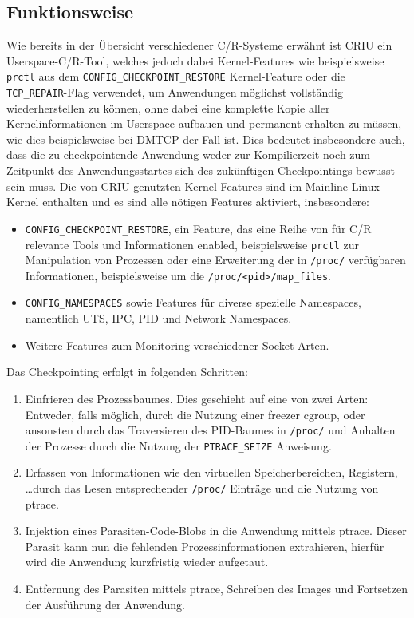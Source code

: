\documentclass[a4paper]{article}
\begin{document}
\subsection{Funktionsweise}
Wie bereits in der Übersicht verschiedener C/R-Systeme erwähnt ist CRIU ein Userspace-C/R-Tool, welches jedoch dabei Kernel-Features wie beispielsweise \texttt{prctl} aus dem \texttt{CONFIG\_CHECKPOINT\_RESTORE} Kernel-Feature oder die \texttt{TCP\_REPAIR}-Flag verwendet, um Anwendungen möglichst vollständig wiederherstellen zu können, ohne dabei eine komplette Kopie aller Kernelinformationen im Userspace aufbauen und permanent erhalten zu müssen, wie dies beispielsweise bei DMTCP der Fall ist. 
Dies bedeutet insbesondere auch, dass die zu checkpointende Anwendung weder zur Kompilierzeit noch zum Zeitpunkt des Anwendungsstartes sich des zukünftigen Checkpointings bewusst sein muss.
Die von CRIU genutzten Kernel-Features sind im Mainline-Linux-Kernel enthalten und es sind alle nötigen Features aktiviert, insbesondere:
\begin{itemize}
    \item \texttt{CONFIG\_CHECKPOINT\_RESTORE}, ein Feature, das eine Reihe von für C/R relevante Tools und Informationen enabled, beispielsweise \texttt{prctl} zur Manipulation von Prozessen oder eine Erweiterung der in \texttt{/proc/} verfügbaren Informationen, beispielsweise um die \texttt{/proc/<pid>/map\_files}. 
    \item \texttt{CONFIG\_NAMESPACES} sowie Features für diverse spezielle Namespaces, namentlich UTS, IPC, PID und Network Namespaces.
    \item Weitere Features zum Monitoring verschiedener Socket-Arten.
\end{itemize}
Das Checkpointing erfolgt in folgenden Schritten:
\begin{enumerate}
    \item Einfrieren des Prozessbaumes. Dies geschieht auf eine von zwei Arten: Entweder, falls möglich, durch die Nutzung einer freezer cgroup, oder ansonsten durch das Traversieren des PID-Baumes in \texttt{/proc/} und Anhalten der Prozesse durch die Nutzung der \texttt{PTRACE\_SEIZE} Anweisung.
    \item Erfassen von Informationen wie den virtuellen Speicherbereichen, Registern, \dots durch das Lesen entsprechender \texttt{/proc/} Einträge und die Nutzung von ptrace.
    \item Injektion eines Parasiten-Code-Blobs in die Anwendung mittels ptrace. Dieser Parasit kann nun die fehlenden Prozessinformationen extrahieren, hierfür wird die Anwendung kurzfristig wieder aufgetaut.
    \item Entfernung des Parasiten mittels ptrace, Schreiben des Images und Fortsetzen der Ausführung der Anwendung.
\end{enumerate}
\end{document}
